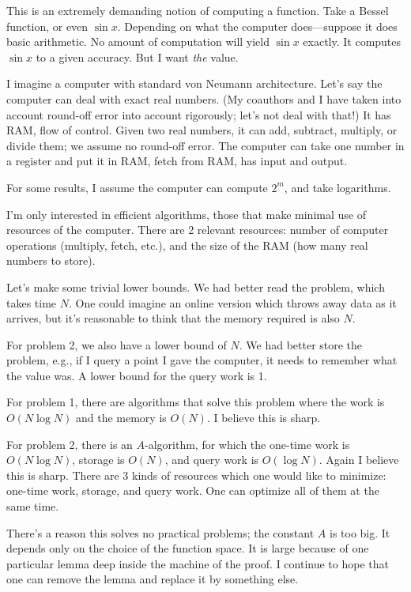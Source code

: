 This is an extremely demanding notion of computing a function. Take a Bessel function, or even $\sin x$. Depending on what the computer does---suppose it does basic arithmetic. No amount of computation will yield $\sin x$ exactly. It computes $\sin x$ to a given accuracy. But I want \emph{the} value.

I imagine a computer with standard von Neumann architecture. Let's say the computer can deal with exact real numbers. (My coauthors and I have taken into account round-off error into account rigorously; let's not deal with that!)
It has RAM, flow of control. Given two real numbers, it can add, subtract, multiply, or divide them; we assume no round-off error. The computer can take one number in a register and put it in RAM, fetch from RAM, has input and output.

For some results, I assume the computer can compute $2^m$, and take logarithms. 

I'm only interested in efficient algorithms, those that make minimal use of resources of the computer. There are 2 relevant resources: number of computer operations (multiply, fetch, etc.), and the size of the RAM (how many real numbers to store).

Let's make some trivial lower bounds. We had better read the problem, which takes time $N$. One could imagine an online version which throws away data as it arrives, but it's reasonable to think that the memory required is also $N$.

For problem 2, we also have  a lower bound of $N$. We had better store the problem, e.g., if I query a point I gave the computer, it needs to remember what the value was. %
A lower bound for the query work is 1.

For problem 1, there are algorithms that solve this problem where the work is $O(N\log N)$ and the memory is $O(N)$. I believe this is sharp.

For problem 2, there is an $A$-algorithm, for which the one-time work is $O(N\log N)$, storage is $O(N)$, and query work is $O(\log N)$. Again I believe this is sharp. There are 3 kinds of resources which one would like to minimize: one-time work, storage, and query work. One can optimize all of them at the same time.

There's a reason this solves no practical problems; the constant $A$ is too big. It depends only on the choice of the function space. It is large because of one particular lemma deep inside the machine of the proof. I continue to hope that one can remove the lemma and replace it by something else.


